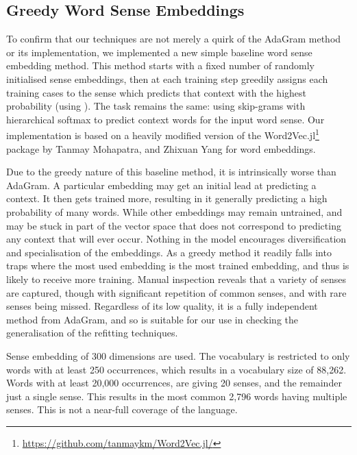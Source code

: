 \documentclass{sig-alternate}
\begin{document}
\subsection{Greedy Word Sense Embeddings}

To confirm that our techniques are not merely a quirk of the AdaGram method or its implementation, we implemented a new simple baseline word sense embedding method.
This method starts with a fixed number of randomly initialised sense embeddings, then at each training step greedily assigns each training cases to the sense which predicts that context with the highest probability (using ). The task remains the same: using skip-grams with hierarchical softmax to predict context words for the input word sense.
Our implementation is based on a heavily modified version of the Word2Vec.jl\footnote{\url{https://github.com/tanmaykm/Word2Vec.jl/}} package by Tanmay Mohapatra, and Zhixuan Yang  for word embeddings.

Due to the greedy nature of this baseline method, it is intrinsically worse than AdaGram. A particular embedding may get an initial lead at predicting a context. 
It then gets trained more, resulting in it generally predicting a high probability of many words.
While other embeddings may remain untrained, and may be stuck in part of the vector space that does not correspond to predicting any context that will ever occur.
Nothing in the model encourages diversification and specialisation of the embeddings.
As a greedy method it readily falls into traps where the most used embedding is the most trained embedding, and thus is likely to receive more training. Manual inspection reveals that a variety of senses are captured, though with significant repetition of common senses, and with rare senses being missed. Regardless of its low quality, it is a fully independent method from AdaGram, and so is suitable for our use in checking the generalisation of the refitting techniques.

Sense embedding of 300 dimensions are used.
The vocabulary is restricted to only words with at least 250 occurrences, which results in a vocabulary size of 88,262. Words with at least 20,000 occurrences, are giving 20 senses, and the remainder just a single sense.
This results in the most common 2,796 words having multiple senses.
This is not a near-full coverage of the language. 
\end{document}
